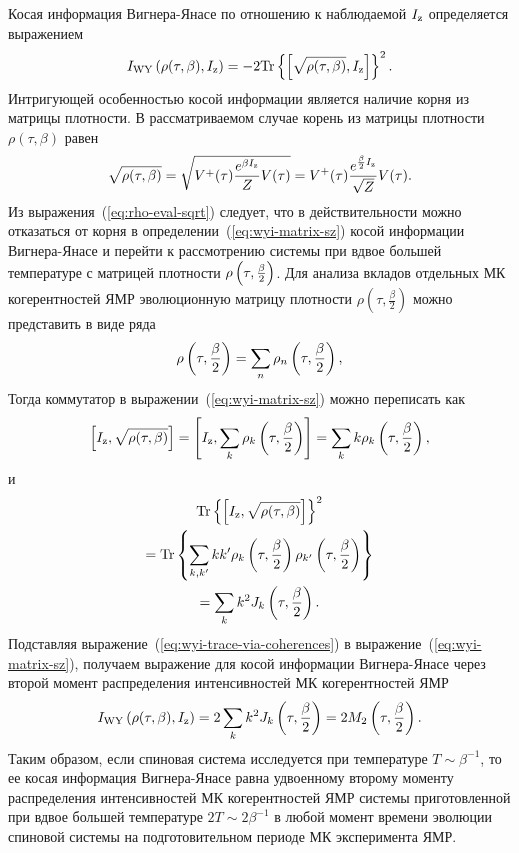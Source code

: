 Косая информация Вигнера-Янасе по отношению к наблюдаемой $I_\mathrm{z}$ определяется выражением~\cite{Wigner1963}
%
\begin{equation}\label{eq:wyi-matrix-sz}
  I_\mathrm{WY}\left( \rho(\tau,\beta),I_\mathrm{z} \right)
  = -2 \mathrm{Tr} \left\{ \left[\sqrt{\rho(\tau,\beta)}, I_\mathrm{z}\right] \right\}^2.
\end{equation}
%
Интригующей особенностью косой информации
является наличие корня из матрицы плотности.
В рассматриваемом случае корень из матрицы плотности $\rho(\tau,\beta)$ равен
%
\begin{equation}\label{eq:rho-eval-sqrt}
  \sqrt{\rho(\tau,\beta)}
  = \sqrt{V^+(\tau)\frac{e^{\beta I_\mathrm{z}}}{Z}V(\tau)}
  = V^+(\tau) \frac{e^{\frac{\beta}{2}I_\mathrm{z}}}{\sqrt{Z}}V(\tau).
\end{equation}
%
Из выражения~(\ref{eq:rho-eval-sqrt}) следует,
что в действительности можно отказаться от корня
в определении~(\ref{eq:wyi-matrix-sz}) косой информации Вигнера-Янасе
и перейти к рассмотрению системы при вдвое большей температуре
с матрицей плотности $\rho\left( \tau,\frac \beta 2 \right)$.
Для анализа вкладов отдельных МК когерентностей ЯМР эволюционную матрицу плотности
$\rho(\tau,\frac \beta 2)$ можно представить в виде ряда~\cite{Feldman1996}
%
\begin{equation}
  \rho\left( \tau,\frac \beta 2 \right) = \sum_n \rho_{n}\left( \tau,\frac \beta 2 \right),
\end{equation}
%
Тогда коммутатор в выражении~(\ref{eq:wyi-matrix-sz}) можно переписать как
%
\begin{equation}
    \left[I_\mathrm{z}, \sqrt{\rho(\tau,\beta)}\right]
    = \left[I_\mathrm{z}, \sum_k \rho_k \left( \tau, \frac{\beta}{2} \right)\right]
    = \sum_k k\rho_k \left( \tau, \frac{\beta}{2} \right),
\end{equation}
%
и
%
\begin{multline}\label{eq:wyi-trace-via-coherences}
  \mathrm{Tr} \left\{ \left[I_\mathrm{z}, \sqrt{\rho(\tau,\beta)}\right] \right\}^2
  \\
  = \mathrm{Tr} \left\{ 
    \sum_{k,k'}kk'
    \rho_k\left( \tau,\frac{\beta}{2} \right)
    \rho_{k'}\left( \tau,\frac{\beta}{2} \right)
   \right\}
  \\
  = \sum_k k^2 J_k\left( \tau,\frac{\beta}{2} \right).
\end{multline}
%
Подставляя выражение~(\ref{eq:wyi-trace-via-coherences}) в выражение~(\ref{eq:wyi-matrix-sz}),
получаем выражение для косой информации Вигнера-Янасе
через второй момент распределения интенсивностей МК когерентностей ЯМР
%
\begin{equation}\label{eq:wyi-via-second-moment}
    I_\mathrm{WY}\left( \rho(\tau, \beta), I_\mathrm{z} \right)
    = 2\sum_k k^2 J_k\left( \tau, \frac{\beta}{2} \right)
    = 2M_2\left( \tau, \frac{\beta}{2} \right).
\end{equation}
%
Таким образом,
если спиновая система исследуется при температуре $T\sim\beta^{-1}$,
то ее косая информация Вигнера-Янасе равна удвоенному второму моменту
распределения интенсивностей  МК когерентностей ЯМР системы приготовленной при вдвое большей температуре $2T \sim 2\beta^{-1}$
в любой момент времени эволюции спиновой системы на подготовительном периоде МК эксперимента ЯМР.

